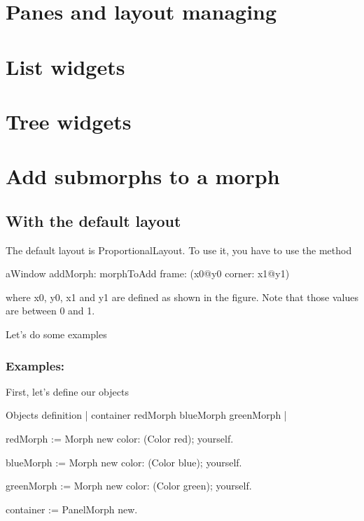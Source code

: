 \documentclass[a4paper,10pt,twoside]{book}
\begin{document}
\section{Panes and layout managing}

\section{List widgets}

\section{Tree widgets}

\section{Add submorphs to a morph}


\subsection{With the default layout}

The default layout is ProportionalLayout. To use it, you have to use the method 
\begin{code}{}
aWindow
	addMorph: morphToAdd
	frame: (x0@y0 corner: x1@y1)
\end{code}
where x0, y0, x1 and y1 are defined as shown in the figure.
Note that those values are between 0 and 1.


Let's do some examples

\subsubsection{Examples:}

First, let's define our objects
\begin{code}{Objects definition}
| container redMorph blueMorph greenMorph |

redMorph := Morph new 
				color: (Color red);
				yourself.
				
blueMorph := Morph new 
				color: (Color blue);
				yourself.
				
greenMorph := Morph new 
				color: (Color green);
				yourself.
				
container := PanelMorph new.
\end{code}
\end{document}
